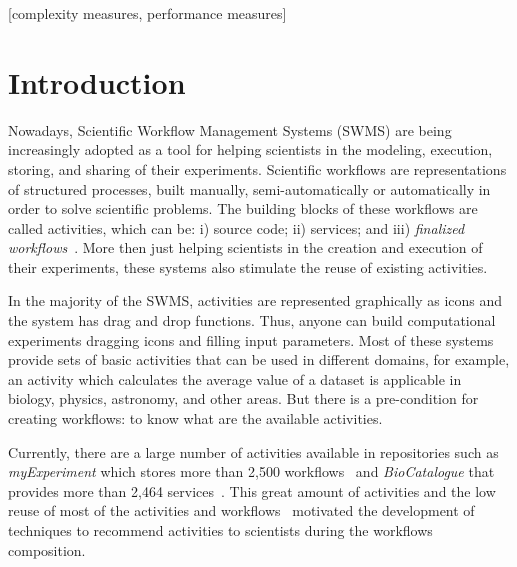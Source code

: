\documentclass{sig-alternate-05-2015}
\begin{document}
[complexity measures, performance measures]



\section{Introduction}\label{INTRODUCAO}
Nowadays, Scientific Workflow Management Systems (SWMS) are being increasingly adopted as a tool for helping scientists in the modeling, execution, storing, and sharing of their experiments. Scientific workflows are representations of structured processes, built manually, semi-automatically or automatically in order to solve scientific problems. The building blocks of these workflows are called activities, which can be: i) source code; ii) services; and iii) \emph{finalized workflows}~\cite{Wang2010}. More then just helping scientists in the creation and execution of their experiments, these systems also stimulate the reuse of existing activities.

In the majority of the SWMS, activities are represented graphically as icons and the system has drag and drop functions. Thus, anyone can build computational experiments dragging icons and filling input parameters. Most of these systems provide sets of basic activities that can be used in different domains, for example, an activity which calculates the average value of a dataset is applicable in biology, physics, astronomy, and other areas. But there is a pre-condition for creating workflows: to know what are the available activities.

Currently, there are a large number of activities available in repositories such as \emph{myExperiment} which stores more than 2,500 workflows~\cite{myExperiment} and \emph{BioCatalogue} that provides more than 2,464 services~\cite{Biocatalogue}. This great amount of activities and the low reuse of most of the activities and workflows~\cite{Wang2010} motivated the development of techniques to recommend activities to scientists during the workflows composition.
\end{document}
